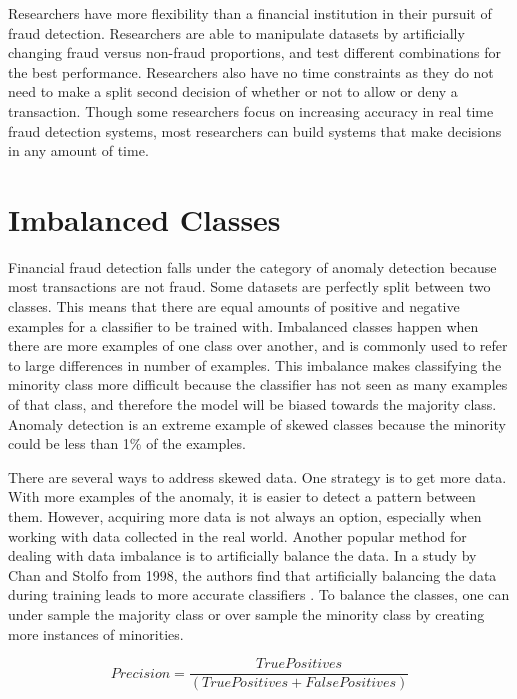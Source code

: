 \documentclass[midd]{thesis}
\begin{document}
Researchers have more flexibility than a financial institution in their pursuit of fraud detection. Researchers are able to manipulate datasets by artificially changing fraud versus non-fraud proportions, and test different combinations for the best performance. Researchers also have no time constraints as they do not need to make a split second decision of whether or not to allow or deny a transaction. Though some researchers focus on increasing accuracy in real time fraud detection systems, most researchers can build systems that make decisions in any amount of time. 

\section{Imbalanced Classes} 

Financial fraud detection falls under the category of anomaly detection because most transactions are not fraud. Some datasets are perfectly split between two classes. This means that there are equal amounts of positive and negative examples for a classifier to be trained with. Imbalanced classes happen when there are more examples of one class over another, and is commonly used to refer to large differences in number of examples. This imbalance makes classifying the minority class more difficult because the classifier has not seen as many examples of that class, and therefore the model will be biased towards the majority class. Anomaly detection is an extreme example of skewed classes because the minority could be less than 1\% of the examples. 

There are several ways to address skewed data. One strategy is to get more data. With more examples of the anomaly, it is easier to detect a pattern between them. However, acquiring more data is not always an option, especially when working with data collected in the real world. Another popular method for dealing with data imbalance is to artificially balance the data.  In a study by Chan and Stolfo from 1998, the authors find that artificially balancing the data during training leads to more accurate classifiers \cite{Chan}. To balance the classes, one can under sample the majority class or over sample the minority class by creating more instances of minorities.

\begin{equation}
\label{eq:precision1}
    Precision = \frac{True Positives} {(True Positives + False Positives)}
\end{equation}
\end{document}
